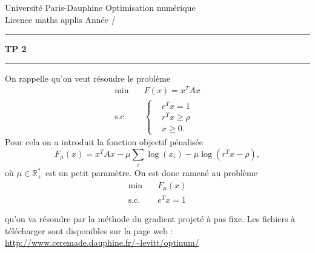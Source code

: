 \documentclass[10pt,a4paper,fleqn]{report}
\makeatletter
\def\cleardoublepage{\clearpage\if@twoside\ifodd\c@page\else\hbox{}\thispagestyle{empty}\newpage\fi\fi}
\makeatother
\begin{document}
\cleardoublepage

\noindent
Universit\'e Paris-Dauphine     \hfill      Optimisation num\'erique\\
Licence maths applis      \hfill      Ann\'ee /

\medskip

\hrule

\medskip



\begin{center}

\textbf{\huge TP 2}

\smallskip

\rule{10cm}{0.4pt}

\end{center}

On rappelle qu'on veut résoudre le problème
\begin{align*}
  \text{min} \quad&F(x)=x^{T} A x\\
  \text{s.c.}\quad&\begin{cases}
    &e^{T} x = 1\\
  &r^{T} x \geq \rho\\
  &x \geq 0.
  \end{cases}
\end{align*}
Pour cela on a introduit la fonction objectif pénalisée
\[F_\mu(x) = x^{T} A x - \mu \sum_i \log(x_i) -\mu \log(r^T x - \rho),\]
où $\mu \in \mathbb{R}_+^*$ est un petit paramètre.
On est donc ramené au problème
\begin{align*}
  \text{min} \quad&F_\mu(x)\\
  \text{s.c.}\quad&e^{T} x = 1
\end{align*}

qu'on va résoudre par la méthode du gradient projeté à pas fixe. Les fichiers à
télécharger sont disponibles sur la page web :
\url{http://www.ceremade.dauphine.fr/~levitt/optinum/}
\end{document}
